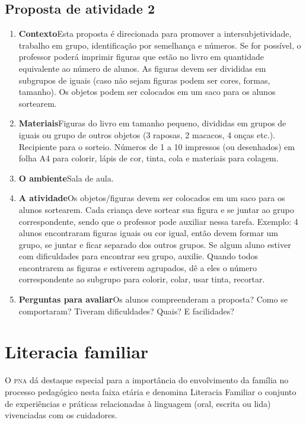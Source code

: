 \documentclass[11pt]{extarticle}
\begin{document}
\subsection{Proposta de atividade 2}


\begin{enumerate}
\item \textbf{Contexto}\quad Esta proposta é direcionada para promover a intersubjetividade, trabalho em grupo, identificação por semelhança e números. Se for possível, o professor poderá imprimir figuras que estão no livro em quantidade equivalente ao número de alunos. As figuras devem ser divididas em subgrupos de iguais (caso não sejam figuras podem ser cores, formas, tamanho). Os objetos podem ser colocados em um saco para os alunos sortearem.

\item \textbf{Materiais}\quad Figuras do livro em tamanho pequeno, divididas em grupos de iguais ou grupo de outros objetos (3 raposas, 2 macacos, 4 onças etc.). Recipiente para o sorteio. Números de 1 a 10 impressos (ou desenhados) em folha A4 para colorir, lápis de cor, tinta, cola e materiais para colagem.

\item \textbf{O ambiente}\quad Sala de aula. 

\item \textbf{A atividade}\quad Os objetos/figuras devem ser colocados em um saco para os alunos sortearem. Cada criança deve sortear sua figura e se  juntar ao grupo correspondente, sendo que o professor pode auxiliar nessa tarefa. Exemplo: 4 alunos encontraram figuras iguais ou cor igual, então devem formar um grupo, se juntar e ficar separado dos outros grupos.
Se algum aluno estiver com dificuldades para encontrar seu grupo, auxilie. Quando todos encontrarem as figuras e estiverem agrupados, dê a eles o número correspondente ao subgrupo para colorir, colar, usar tinta, recortar.

\item \textbf{Perguntas para avaliar}\quad Os alunos compreenderam a proposta? Como se comportaram? Tiveram dificuldades? Quais? E facilidades? 
\end{enumerate}


\section{Literacia familiar}
O \textsc{pna} dá destaque especial para a importância do envolvimento da família 
no processo pedagógico nesta faixa etária e denomina Literacia Familiar o conjunto 
de experiências e práticas relacionadas à linguagem (oral, escrita ou lida) vivenciadas 
com os cuidadores. 
\end{document}
